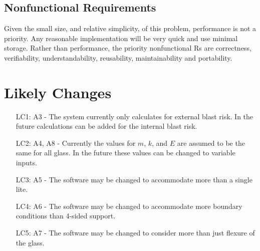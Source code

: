 \documentclass[12pt]{article}
\begin{document}
\subsection{Nonfunctional Requirements}
\label{Sec:NRs}
Given the small size, and relative simplicity, of this problem, performance is not a priority. Any reasonable implementation will be very quick and use minimal storage. Rather than performance, the priority nonfunctional Rs are correctness, verifiability, understandability, reusability, maintainability and portability.
\section{Likely Changes}
\label{Sec:LCs}
\begin{itemize}
\item[LC1:]A3 - The system currently only calculates for external blast risk. In the future calculations can be added for the internal blast risk.
\item[LC2:]A4, A8 - Currently the values for $m$, $k$, and $E$ are assumed to be the same for all glass. In the future these values can be changed to variable inputs.
\item[LC3:]A5 - The software may be changed to accommodate more than a single lite.
\item[LC4:]A6 - The software may be changed to accommodate more boundary conditions than 4-sided support.
\item[LC5:]A7 - The software may be changed to consider more than just flexure of the glass.
\end{itemize}
\end{document}
